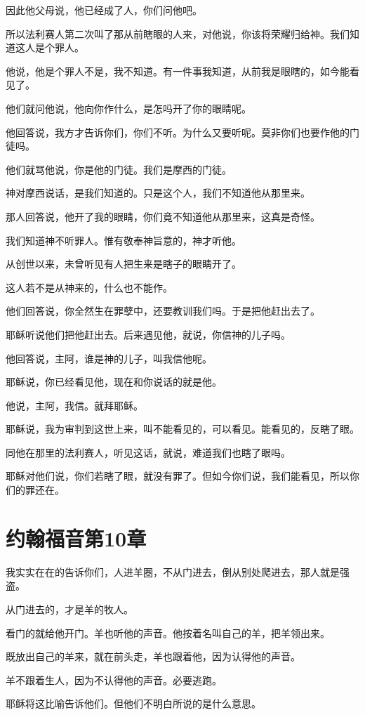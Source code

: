 \documentclass[12pt,oneside]{book}
\begin{document}
因此他父母说，他已经成了人，你们问他吧。

所以法利赛人第二次叫了那从前瞎眼的人来，对他说，你该将荣耀归给神。我们知道这人是个罪人。

他说，他是个罪人不是，我不知道。有一件事我知道，从前我是眼瞎的，如今能看见了。

他们就问他说，他向你作什么，是怎吗开了你的眼睛呢。

他回答说，我方才告诉你们，你们不听。为什么又要听呢。莫非你们也要作他的门徒吗。

他们就骂他说，你是他的门徒。我们是摩西的门徒。

神对摩西说话，是我们知道的。只是这个人，我们不知道他从那里来。

那人回答说，他开了我的眼睛，你们竟不知道他从那里来，这真是奇怪。

我们知道神不听罪人。惟有敬奉神旨意的，神才听他。

从创世以来，未曾听见有人把生来是瞎子的眼睛开了。

这人若不是从神来的，什么也不能作。

他们回答说，你全然生在罪孽中，还要教训我们吗。于是把他赶出去了。

耶稣听说他们把他赶出去。后来遇见他，就说，你信神的儿子吗。

他回答说，主阿，谁是神的儿子，叫我信他呢。

耶稣说，你已经看见他，现在和你说话的就是他。

他说，主阿，我信。就拜耶稣。

耶稣说，我为审判到这世上来，叫不能看见的，可以看见。能看见的，反瞎了眼。

同他在那里的法利赛人，听见这话，就说，难道我们也瞎了眼吗。

耶稣对他们说，你们若瞎了眼，就没有罪了。但如今你们说，我们能看见，所以你们的罪还在。

\chapter{约翰福音第10章}
我实实在在的告诉你们，人进羊圈，不从门进去，倒从别处爬进去，那人就是强盗。

从门进去的，才是羊的牧人。

看门的就给他开门。羊也听他的声音。他按着名叫自己的羊，把羊领出来。

既放出自己的羊来，就在前头走，羊也跟着他，因为认得他的声音。

羊不跟着生人，因为不认得他的声音。必要逃跑。

耶稣将这比喻告诉他们。但他们不明白所说的是什么意思。
\end{document}
